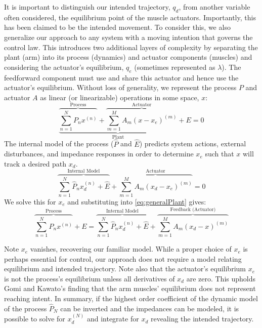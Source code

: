 \documentclass[10pt]{article}
\begin{document}
It is important to distinguish our intended trajectory, $q_d$, from another variable often considered, the equilibrium point of the muscle actuators. Importantly, this has been claimed to be the intended movement. To consider this, we also generalize our approach to any system with a moving intention that governs the control law. This introduces two additional layers of complexity by separating the plant (arm) into its process (dynamics) and actuator components (muscles) and considering the actuator's equilibrium, $q_e$ (sometimes represented as $\lambda$). The feedforward component must use and share this actuator and hence use the actuator's equilibrium. Without loss of generality, we represent the process $P$ and actuator $A$ as linear (or linearizable) operations in some space, $x$:
\begin{equation} \label{eq:generalPlant}
\underbrace{\overbrace{\sum_{n=1}^N P_nx^{(n)}}^\text{Process}+\overbrace{\sum_{m=1}^M A_m(x-x_e)^{(m)}}^\text{Actuator}}_\text{Plant}+E=0
\end{equation}
The internal model of the process ($\hat{P}$ and $\hat{E}$) predicts system actions, external disturbances, and impedance responses in order to determine $x_e$ such that $x$ will track a desired path $x_d$.    
\begin{equation}
\overbrace{\sum_{n=1}^N \hat{P}_n x^{(n)}_d+\hat{E}}^\text{Internal Model}+\overbrace{\sum_{m=1}^M A_m(x_d-x_e)^{(m)}}^\text{Actuator}=0
\end{equation}
We solve this for $x_e$ and substituting into \eqref{eq:generalPlant} gives:
\begin{equation}
\overbrace{\sum_{n=1}^N P_nx^{(n)}}^\text{Process}+E=\overbrace{\sum_{n=1}^N \hat{P}_n x^{(n)}_d+\hat{E}}^\text{Internal Model}+\overbrace{\sum_{m=1}^M A_m (x_d-x)^{(m)}}^\text{Feedback (Actuator)}
\end{equation}

Note $x_e$ vanishes, recovering our familiar model. While a proper choice of $x_e$ is perhaps essential for control, our approach does not require a model relating equilibrium and intended trajectory. Note also that the actuator's equilibrium $x_e$ is not the process's equilibrium unless all derivatives of $x_d$ are zero. This upholds Gomi and Kawato's finding that the arm muscles' equilibrium does not represent reaching intent\cite{gomi1997human}. In summary, if the highest order coefficient of the dynamic model of the process $\hat{P}_N$ can be inverted and the impedances can be modeled, it is possible to solve for $x_d^{(N)}$ and integrate for $x_d$ revealing the intended trajectory.
\end{document}
